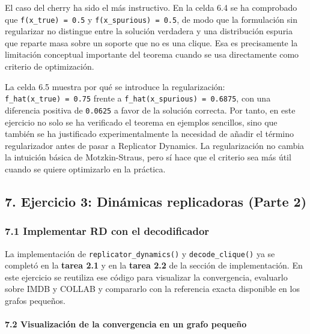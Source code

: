 \documentclass[11pt]{article}
\begin{document}
El caso del cherry ha sido el más instructivo. En la celda 6.4 se ha
comprobado que \texttt{f(x\_true)\ =\ 0.5} y
\texttt{f(x\_spurious)\ =\ 0.5}, de modo que la formulación sin
regularizar no distingue entre la solución verdadera y una distribución
espuria que reparte masa sobre un soporte que no es una clique. Esa es
precisamente la limitación conceptual importante del teorema cuando se
usa directamente como criterio de optimización.

La celda 6.5 muestra por qué se introduce la regularización:
\texttt{f\_hat(x\_true)\ =\ 0.75} frente a
\texttt{f\_hat(x\_spurious)\ =\ 0.6875}, con una diferencia positiva de
\texttt{0.0625} a favor de la solución correcta. Por tanto, en este
ejercicio no solo se ha verificado el teorema en ejemplos sencillos,
sino que también se ha justificado experimentalmente la necesidad de
añadir el término regularizador antes de pasar a Replicator Dynamics. La
regularización no cambia la intuición básica de Motzkin-Straus, pero sí
hace que el criterio sea más útil cuando se quiere optimizarlo en la
práctica.

    \subsection{7. Ejercicio 3: Dinámicas replicadoras (Parte
2)}\label{ejercicio-3-dinuxe1micas-replicadoras-parte-2}

    \subsubsection{7.1 Implementar RD con el
decodificador}\label{implementar-rd-con-el-decodificador}

La implementación de \texttt{replicator\_dynamics()} y
\texttt{decode\_clique()} ya se completó en la \textbf{tarea 2.1} y en
la \textbf{tarea 2.2} de la sección de implementación. En este ejercicio
se reutiliza ese código para visualizar la convergencia, evaluarlo sobre
IMDB y COLLAB y compararlo con la referencia exacta disponible en los
grafos pequeños.

    \paragraph{7.2 Visualización de la convergencia en un grafo
pequeño}\label{visualizaciuxf3n-de-la-convergencia-en-un-grafo-pequeuxf1o}
\end{document}
